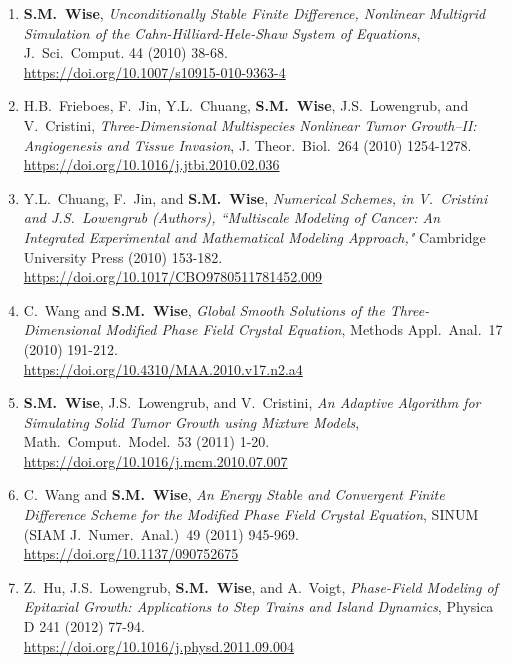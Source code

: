 \documentclass[10pt,letterpaper]{article}
\begin{document}
\begin{enumerate}
    \item
\textbf{S.M.~Wise}, {\sl Unconditionally Stable Finite Difference, Nonlinear Multigrid Simulation of the Cahn-Hilliard-Hele-Shaw System of Equations}, J.~Sci.~Comput. 44 (2010) 38-68.
	\\
\url{https://doi.org/10.1007/s10915-010-9363-4}
	\item
H.B.~Frieboes, F.~Jin, Y.L.~Chuang, \textbf{S.M.~Wise}, J.S.~Lowengrub, and V.~Cristini, {\sl Three-Dimensional Multispecies Nonlinear Tumor Growth--II: Angiogenesis and Tissue Invasion}, J. Theor.~Biol.~264 (2010) 1254-1278.
	\\
\url{https://doi.org/10.1016/j.jtbi.2010.02.036}

	\item
Y.L.~Chuang, F.~Jin, and \textbf{S.M.~Wise}, {\sl Numerical Schemes, in V.~Cristini and J.S.~Lowengrub (Authors), ``Multiscale Modeling of Cancer: An Integrated Experimental and Mathematical Modeling Approach,"} Cambridge University Press (2010) 153-182.
	\\
\url{https://doi.org/10.1017/CBO9780511781452.009}

	\item
C.~Wang and \textbf{S.M.~Wise}, {\sl Global Smooth Solutions of the Three-Dimensional Modified Phase Field Crystal Equation}, Methods Appl.~Anal.~17 (2010) 191-212.
	\\
\url{https://doi.org/10.4310/MAA.2010.v17.n2.a4}

    \item
\textbf{S.M.~Wise}, J.S.~Lowengrub, and V.~Cristini, {\sl An Adaptive Algorithm for Simulating Solid Tumor Growth using Mixture Models}, Math.~Comput.~Model.~53 (2011) 1-20.
	\\
\url{https://doi.org/10.1016/j.mcm.2010.07.007}
 
	\item
C.~Wang and \textbf{S.M.~Wise}, {\sl An Energy Stable and Convergent Finite Difference Scheme for the Modified Phase Field Crystal Equation}, SINUM (SIAM J.~Numer.~Anal.)~49 (2011) 945-969.
	\\
\url{https://doi.org/10.1137/090752675}

	\item
Z.~Hu, J.S.~Lowengrub, \textbf{S.M.~Wise}, and A.~Voigt, {\sl Phase-Field Modeling of Epitaxial Growth: Applications to Step Trains and Island Dynamics}, Physica D 241 (2012) 77-94.
	\\
\url{https://doi.org/10.1016/j.physd.2011.09.004}


\end{enumerate}
\end{document}
